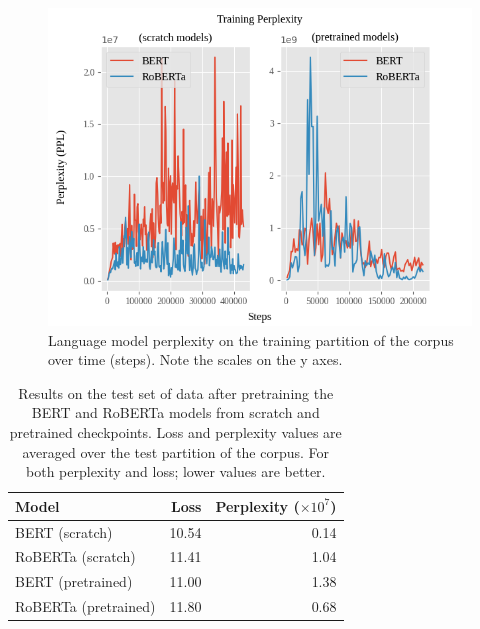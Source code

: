 \documentclass[12pt]{article}
\begin{document}
\begin{figure}[!t]
    \includegraphics[width=\linewidth]{figures/training_ppl.png}
    \caption{Language model perplexity on the training partition of the corpus over time (steps). Note the scales on the y axes.}
    \label{fig:training_ppl}
\end{figure}

\begin{table}[!t]
    \centering
    \begin{tabular}{l r r}
        \toprule
        Model                & Loss  & Perplexity ($\times 10^7$) \\
        \midrule
        BERT (scratch)       & 10.54 & 0.14                       \\ %
        RoBERTa (scratch)    & 11.41 & 1.04                       \\ %
        BERT (pretrained)    & 11.00 & 1.38                       \\ %
        RoBERTa (pretrained) & 11.80 & 0.68                       \\ %
        \bottomrule
    \end{tabular}
    \caption{Results on the test set of data after pretraining the BERT and RoBERTa models from scratch and pretrained checkpoints. Loss and
        perplexity values are averaged over the test partition of the corpus. For both perplexity and loss; lower values are better.}
    \label{tab:pretraining_results}
\end{table}
\end{document}

